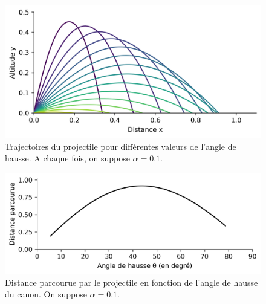 \documentclass[a4paper,12pt]{article} %
\begin{document}
\begin{figure}
  \centering
  \includegraphics[width=.75\textwidth]{trajectories}
  \caption{
    Trajectoires du projectile pour différentes valeurs de l'angle de hausse.
    A chaque fois, on suppose $\alpha = 0.1$.
    }\label{fig: trajectories}
\end{figure}

\begin{figure}
  \centering
  \includegraphics[width=.75\textwidth]{distance_parcourue}
  \caption{
    Distance parcourue par le projectile en fonction de l'angle de hausse du canon.
    On suppose $\alpha = 0.1$.
    }\label{fig: distance parcourue}
\end{figure}
\end{document}
